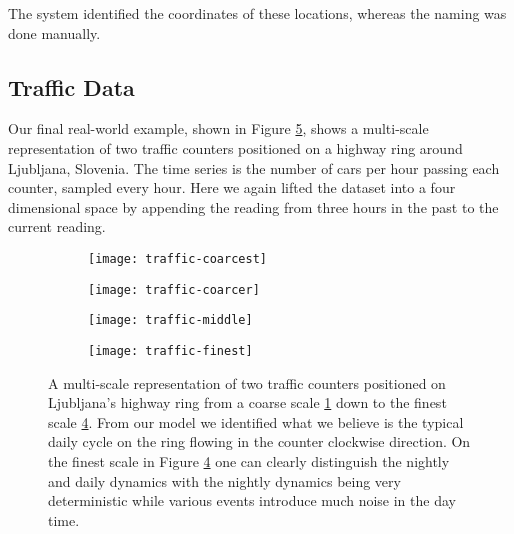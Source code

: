 The system identified the coordinates of these locations, whereas the naming was done manually.

\subsection{Traffic Data}

Our final real-world example, shown in Figure \ref{fig:example-traffic-multiscale}, shows a multi-scale representation of two traffic counters positioned on a highway ring around Ljubljana, Slovenia. The time series is the number of cars per hour passing each counter, sampled every hour.  Here we again lifted the dataset into a four dimensional space by appending the reading from three hours in the past to the current reading.

\begin{figure}[h!]
  	\centering
  	\begin{subfigure}[b]{.48\columnwidth}
	  	\centering
	  	\texttt{[image: traffic-coarcest]}
  		\caption{\label{fig:traffic-coarcest}}
	\end{subfigure}
  	\begin{subfigure}[b]{.48\columnwidth}
	  	\centering
	  	\texttt{[image: traffic-coarcer]}
  		\caption{\label{fig:traffic-coarcer}}
	\end{subfigure}
	\begin{subfigure}[b]{.48\columnwidth}
	  	\centering
	  	\texttt{[image: traffic-middle]}
  		\caption{\label{fig:traffic-middle}}
	\end{subfigure}
	\begin{subfigure}[b]{.48\columnwidth}
	  	\centering
	  	\texttt{[image: traffic-finest]}
  		\caption{\label{fig:traffic-finest}}
	\end{subfigure}
  	\caption{A multi-scale representation of two traffic counters positioned on Ljubljana's highway ring from a coarse scale \ref{fig:traffic-coarcest} down to the finest scale \ref{fig:traffic-finest}. From our model we identified what we believe is the typical daily cycle on the ring flowing in the counter clockwise direction. On the finest scale in Figure \ref{fig:traffic-finest} one can clearly distinguish the nightly and daily dynamics with the nightly dynamics being very deterministic while various events introduce much noise in the day time.}
  	\label{fig:example-traffic-multiscale}
\end{figure}

